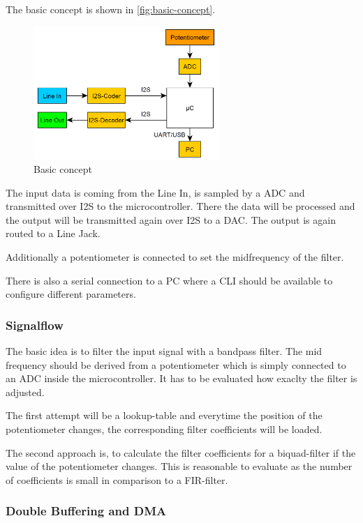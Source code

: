 The basic concept is shown in \autoref{fig:basic-concept}.

\begin{figure}[!h]
    \centering
    \includegraphics[width=7cm]{img/basic_concept.PNG}
    \caption{Basic concept}
    \label{fig:basic-concept}
\end{figure}

The input data is coming from the Line In, is sampled by a \ac{ADC} and transmitted
over \ac{I2S} to the microcontroller. There the data will be processed and the output will be transmitted
again over \ac{I2S} to a \ac{DAC}. The output is again routed to a Line Jack.

Additionally a potentiometer is connected to set the midfrequency of the filter.

There is also a serial connection to a PC where a \ac{CLI} should be available to configure
different parameters.

\subsubsection{Signalflow}

The basic idea is to filter the input signal with a bandpass filter. The mid frequency should be derived
from a potentiometer which is simply connected to an \ac{ADC} inside the microcontroller. It has to be evaluated
how exaclty the filter is adjusted.

The first attempt will be a lookup-table and everytime the position of the
potentiometer changes, the corresponding filter coefficients will be loaded.

The second approach is, to calculate the filter coefficients for a biquad-filter if the value of the potentiometer changes.
This is reasonable to evaluate as the number of coefficients is small in comparison to a \ac{FIR}-filter.

\subsubsection{Double Buffering and DMA}

